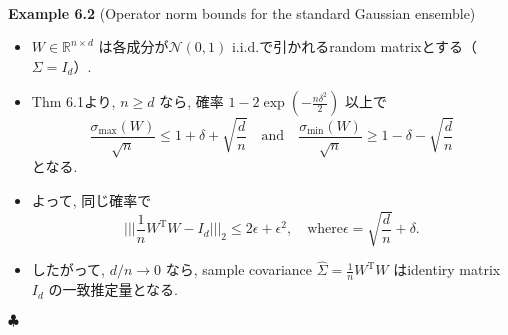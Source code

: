 \documentclass[unicode,aspectratio=169,11pt]{beamer}
\def\endexample{\hfill $\clubsuit$}
\newcommand{\bb}{\mathbb}
\newcommand{\cc}{\mathcal}
\newcommand{\tr}{\mathrm{T}}
\begin{document}
\begin{frame}{}{}
　\\
{\bf Example 6.2} (Operator norm bounds for the standard Gaussian ensemble)
\begin{itemize}
  \item $W \in \bb{R}^{n \times d}$ は各成分が$\cc{N} (0,1)$ i.i.d.で引かれるrandom matrixとする（$\Sigma = I_d$）.
  \item Thm 6.1より, $n \ge d$ なら, 確率 $1 - 2 \exp\left(-\frac{n\delta^2}{2}\right)$ 以上で
  \[\frac{\sigma_{\max}(W)}{\sqrt{n}} \le 1 + \delta + \sqrt{\frac{d}{n}}
  \quad \mathrm{and} \quad
  \frac{\sigma_{\min}(W)}{\sqrt{n}} \ge 1 - \delta - \sqrt{\frac{d}{n}}
  \tag{6.10}
  \]
  となる.
  \item よって, 同じ確率で
  \[ \Bigg|\Bigg|\Bigg| \frac{1}{n}W^\tr W - I_d \Bigg|\Bigg|\Bigg|_2 \le 2\epsilon + \epsilon^2,
  \quad \mathrm{where} \epsilon = \sqrt{\frac{d}{n}} + \delta.
  \tag{6.11} \]
  \item したがって, $d/n \to 0$ なら, sample covariance $\widehat{\Sigma} = \frac{1}{n}W^\tr W$ はidentiry matrix $I_d$ の一致推定量となる.
\end{itemize}
\endexample
\end{frame}
\end{document}
